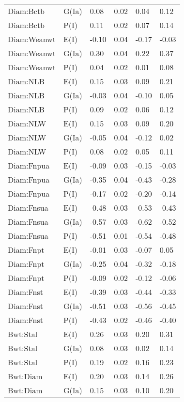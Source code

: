\begin{center}
\begin{longtable}{|p{1.1in}|p{0.7in}|p{0.7in}|p{0.6in}|p{0.6in}|p{0.6in}|}
  Diam:Bctb & G(Ia) & 0.08 & 0.02 & 0.04 & 0.12 \\ 
  Diam:Bctb & P(I) & 0.11 & 0.02 & 0.07 & 0.14 \\ 
  Diam:Weanwt & E(I) & -0.10 & 0.04 & -0.17 & -0.03 \\ 
  Diam:Weanwt & G(Ia) & 0.30 & 0.04 & 0.22 & 0.37 \\ 
  Diam:Weanwt & P(I) & 0.04 & 0.02 & 0.01 & 0.08 \\ 
  Diam:NLB & E(I) & 0.15 & 0.03 & 0.09 & 0.21 \\ 
  Diam:NLB & G(Ia) & -0.03 & 0.04 & -0.10 & 0.05 \\ 
  Diam:NLB & P(I) & 0.09 & 0.02 & 0.06 & 0.12 \\ 
  Diam:NLW & E(I) & 0.15 & 0.03 & 0.09 & 0.20 \\ 
  Diam:NLW & G(Ia) & -0.05 & 0.04 & -0.12 & 0.02 \\ 
  Diam:NLW & P(I) & 0.08 & 0.02 & 0.05 & 0.11 \\ 
  Diam:Fnpua & E(I) & -0.09 & 0.03 & -0.15 & -0.03 \\ 
  Diam:Fnpua & G(Ia) & -0.35 & 0.04 & -0.43 & -0.28 \\ 
  Diam:Fnpua & P(I) & -0.17 & 0.02 & -0.20 & -0.14 \\ 
  Diam:Fnsua & E(I) & -0.48 & 0.03 & -0.53 & -0.43 \\ 
  Diam:Fnsua & G(Ia) & -0.57 & 0.03 & -0.62 & -0.52 \\ 
  Diam:Fnsua & P(I) & -0.51 & 0.01 & -0.54 & -0.48 \\ 
  Diam:Fnpt & E(I) & -0.01 & 0.03 & -0.07 & 0.05 \\ 
  Diam:Fnpt & G(Ia) & -0.25 & 0.04 & -0.32 & -0.18 \\ 
  Diam:Fnpt & P(I) & -0.09 & 0.02 & -0.12 & -0.06 \\ 
  Diam:Fnst & E(I) & -0.39 & 0.03 & -0.44 & -0.33 \\ 
  Diam:Fnst & G(Ia) & -0.51 & 0.03 & -0.56 & -0.45 \\ 
  Diam:Fnst & P(I) & -0.43 & 0.02 & -0.46 & -0.40 \\ 
  Bwt:Stal & E(I) & 0.26 & 0.03 & 0.20 & 0.31 \\ 
  Bwt:Stal & G(Ia) & 0.08 & 0.03 & 0.02 & 0.14 \\ 
  Bwt:Stal & P(I) & 0.19 & 0.02 & 0.16 & 0.23 \\ 
  Bwt:Diam & E(I) & 0.20 & 0.03 & 0.14 & 0.26 \\ 
  Bwt:Diam & G(Ia) & 0.15 & 0.03 & 0.10 & 0.20 \\ 

\end{longtable}
\end{center}
